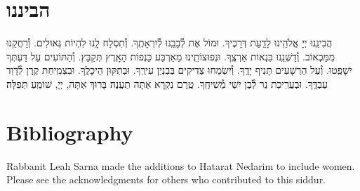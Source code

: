 \documentclass[twoside, openany, parskip=half, 11pt]{book}
\begin{document}
\chapter{הביננו}


הֲבִינֵֽנוּ יְיָ אֱלֹהֵֽינוּ לָדַֽעַת דְּרָכֶיךָ. וּמוֹל אֶת לְ֯בָבֵֽנוּ לְ֯יִרְאָתֶֽךָ. וְ֯תִסְלַח לָֽנוּ לִהְיוֹת גְּאוּלִים. וְ֯רַחֲקֵנוּ מִמַּכְאוֹב. וְ֯דַשְּׁנֵֽנוּ בִּנְאוֹת אַרְצֶֽךָ. וּנְפוּצוֹתֵֽינוּ מֵאַרְבַּע כַּנְפוֹת הָאָֽרֶץ תְּקַבֵּץ. וְ֯הַתּוֹעִים עַל דַּעְתְּךָ יִשָׁפֵֽטוּ. וְ֯עַל הַרְשָׁעִים תָּנִיף יָדֶֽךָ. וְ֯יִשְׂמְחוּ צַדִיקִים בְּבִנְיַן עִירֶֽךָ. וּבְתִקּוּן הֵיכָלֶֽךָ. וּבִצְמִֽיחַת קֶֽרֶן לְ֯דָוִד עַבְדֶּֽךָ. וּבְעֲרִֽיכַת נֵר לְ֯בֶן יִשַׁי מְ֯שִׁיחֶֽךָ. טֶֽרֶם נִקְרָא אַתָּה תַעֲנֶה׃ בָּרוּךְ אַתָּה, יְיָ, שׁוֹמֵֽעַ תְּפִלָּה׃

\chapter{Bibliography}
\begin{english}
\nocite{artcant}
\nocite{artscroll}
\nocite{avodasyisroel}
\nocite{birnbaum}
\nocite{korenyt}
\nocite{mapm}
\nocite{olastamid}
\nocite{levshalem}
\nocite{sacks_koren_2016}
\nocite{simshalom}
\nocite{simshalomweekday}
\nocite{tefillatyesharim}

\printbibliography
Rabbanit Leah Sarna made the additions to Hatarat Nedarim to include women. Please see the acknowledgments for others who contributed to this siddur.

\end{english}

\end{document}
